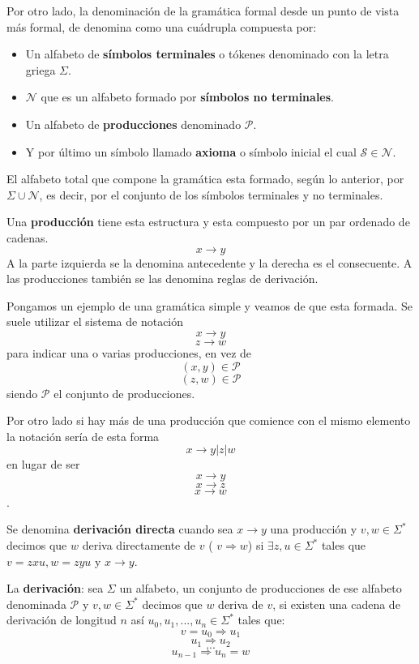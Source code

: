 Por otro lado, la denominación de la gramática formal desde un punto de vista más formal, de denomina como una cuádrupla compuesta por:

\begin{itemize}
	\item Un alfabeto de \textbf{símbolos terminales} o tókenes denominado con la letra griega $\Sigma$.
	\item $\mathcal{N}$ que es un alfabeto formado por \textbf{símbolos no terminales}.
	\item Un alfabeto de \textbf{producciones} denominado $\mathcal{P}$.
	\item Y por último un símbolo llamado \textbf{axioma} o símbolo inicial el cual $\mathcal{S} \in \mathcal{N}$.
\end{itemize}

El alfabeto total que compone la gramática esta formado, según lo anterior, por $\Sigma\cup\mathcal{N}$, es decir, por el conjunto de los símbolos terminales y no terminales.

Una \textbf{producción} tiene esta estructura y esta compuesto por un par ordenado de cadenas. \[x \rightarrow y\] A la parte izquierda se la denomina antecedente y la derecha es el consecuente. A las producciones también se las denomina reglas de derivación.

Pongamos un ejemplo de una gramática simple y veamos de que esta formada. Se suele utilizar el sistema de notación  \[x \rightarrow y\] \[z \rightarrow w\] para indicar una o varias producciones, en vez de \[(x, y) \in \mathcal{P} \] \[(z, w) \in \mathcal{P} \] siendo $\mathcal{P}$ el conjunto de producciones.

Por otro lado si hay más de una producción que comience con el mismo elemento la notación sería de esta forma \[ x \rightarrow y | z | w\] en lugar de ser \[ x \rightarrow y\] \[x \rightarrow z\] \[x \rightarrow w\].

Se denomina \textbf{derivación directa} cuando sea $x \rightarrow y$ una producción y $v, w \in \Sigma^{*}$ decimos que $w$ deriva directamente de $v$ ( $v \Rightarrow w$) si $\exists z, u \in \Sigma^{*}$ tales que $v=zxu, w=zyu$ y $x\rightarrow y$.

La \textbf{derivación}: sea $\Sigma$ un alfabeto, un conjunto de producciones de ese alfabeto denominada $\mathcal{P}$ y $v, w \in \Sigma^{*}$ decimos que $w$ deriva de $v$, si existen una cadena de derivación de longitud $n$ así $u_{0}, u_{1}, ..., u_{n} \in \Sigma^{*}$ tales que:
 \[ v = u_{0} \Rightarrow u_{1}\] \[ u_{1} \Rightarrow u_{2}\] \[...\] \[ u_{n-1} \Rightarrow u_{n} = w\]

